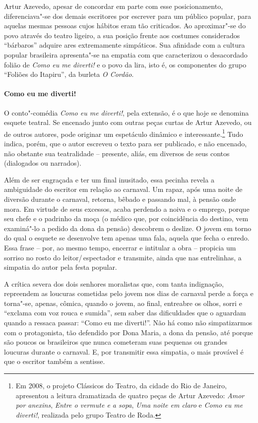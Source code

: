 Artur Azevedo, apesar de concordar em parte com esse posicionamento,
diferenciava"-se dos demais escritores por escrever para um público
popular, para aquelas mesmas pessoas cujos hábitos eram tão criticados.
Ao aproximar"-se do povo através do teatro ligeiro, a sua posição
frente aos costumes considerados “bárbaros” adquire ares extremamente
simpáticos. Sua afinidade com a cultura popular brasileira apresenta"-se
na empatia com que caracterizou o desacordado folião de \textit{Como eu
me diverti!} e o povo da lira, isto é, os componentes do grupo “Foliões
do Itapiru”, da burleta \textit{O Cordão}.

\paragraph{Como eu me diverti!}

O conto"-comédia \textit{Como eu me diverti!}, pela extensão, é o que
hoje se denomina esquete teatral. Se encenado junto com outras peças
curtas de Artur Azevedo, ou de outros autores, pode originar um
espetáculo dinâmico e interessante.\footnote{ Em 2008, o projeto
Clássicos do Teatro, da cidade do Rio de Janeiro, apresentou a leitura
dramatizada de quatro peças de Artur Azevedo: \textit{Amor por
anexins}, \textit{Entre o vermute e a sopa}, \textit{Uma noite em claro
}e \textit{Como eu me diverti!}, realizada pelo grupo Teatro de Roda.}
Tudo indica, porém, que o autor escreveu o texto para ser publicado, e
não encenado, não obstante sua teatralidade -- presente, aliás, em
diversos de seus contos (dialogados ou narrados).

Além de ser engraçada e ter um final inusitado, essa pecinha revela a
ambiguidade do escritor em relação ao carnaval. Um rapaz, após uma
noite de diversão durante o carnaval, retorna, bêbado e passando mal, à
pensão onde mora. Em virtude de seus excessos, acaba perdendo a noiva e
o emprego, porque seu chefe e o padrinho da moça (o médico que, por
coincidência do destino, vem examiná"-lo a pedido da dona da pensão)
descobrem o deslize. O jovem em torno do qual o esquete se desenvolve
tem apenas uma fala, aquela que fecha o enredo. Essa frase -- por,
ao mesmo tempo, encerrar e intitular a obra -- propicia um sorriso
no rosto do leitor/\,espectador e transmite, ainda que nas entrelinhas, a
simpatia do autor pela festa popular. 

A crítica severa dos dois senhores moralistas que, com tanta indignação,
repreendem as loucuras cometidas pelo jovem nos dias de carnaval perde
a força e torna"-se, apenas, cômica, quando o jovem, ao final, entreabre
os olhos, sorri e “exclama com voz rouca e sumida”, sem saber das
dificuldades que o aguardam quando a ressaca passar: “Como eu me
diverti!”. Não há como não simpatizarmos com o protagonista, tão
defendido por Dona Maria, a dona da pensão, até porque são poucos os
brasileiros que nunca cometeram suas pequenas ou grandes loucuras
durante o carnaval. E, por transmitir essa simpatia, o mais provável é
que o escritor também a sentisse.

